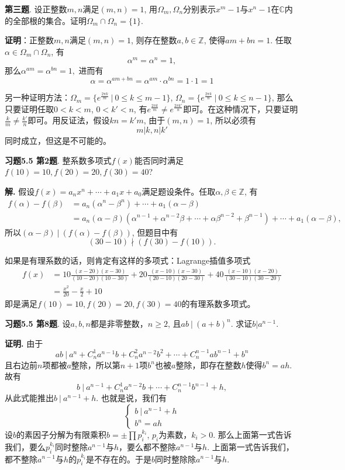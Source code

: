 \newpageorvspace


{\bf 第三题}. 设正整数$m,n$满足$(m,n)=1$, 用$\Omega_m, \Omega_n$分别表示$x^m-1$与$x^n-1$在$\mathbb{C}$内的全部根的集合。证明$\Omega_m \cap \Omega_n = \{1\}$.

{\bf 证明}：正整数$m,n$满足$(m,n)=1$, 则存在整数$a,b\in\mathbb{Z}$, 使得$am+bn=1$. 任取$\alpha\in \Omega_m \cap \Omega_n$, 有
$$\alpha^m = \alpha^n = 1,$$
那么$\alpha^{am} = \alpha^{bn} = 1,$ 进而有
$$\alpha = \alpha^{am+bn} = \alpha^{am} \cdot \alpha^{bn} = 1 \cdot 1 = 1$$

另一种证明方法：$\Omega_m = \{ e^{\frac{2\pi k}{m}} \ |\ 0\leqslant k \leqslant m-1 \}$, $\Omega_n = \{ e^{\frac{2\pi k}{n}} \ |\ 0\leqslant k \leqslant n-1 \}$, 那么只要证明任取$0 < k < m$, $0 < k' < n$, 有$e^{\frac{2\pi k}{m}} \neq e^{\frac{2\pi k'}{n}}$即可。在这种情况下，只要证明$\frac{k}{m} \neq \frac{k'}{n}$即可。用反证法，假设$kn=k'm$, 由于$(m,n)=1$, 所以必须有
$$m|k, n|k'$$
同时成立，但这是不可能的。


\newpageorvspace


{\bf 习题5.5 第2题}. 整系数多项式$f(x)$能否同时满足$f(10)=10, f(20)=20, f(30)=40$?

{\bf 解.} 假设$f(x) = a_nx^n + \cdots + a_1x + a_0$满足题设条件。任取$\alpha,\beta\in\mathbb{Z}$, 有
\begin{align*}
f(\alpha) - f(\beta) & = a_n(\alpha^n-\beta^n) + \cdots + a_1(\alpha-\beta) \\
& = a_n(\alpha-\beta)(\alpha^{n-1}+\alpha^{n-2}\beta+\cdots+\alpha\beta^{n-2}+\beta^{n-1}) + \cdots + a_1(\alpha-\beta),
\end{align*}
所以$(\alpha-\beta) \ |\ (f(\alpha) - f(\beta))$, 但题目中有
$$(30-10) \nmid (f(30)-f(10)).$$

如果是有理系数的话，则肯定有这样的多项式：Lagrange插值多项式
\begin{align*}
f(x) & = 10\frac{(x-20)(x-30)}{(10-20)(10-30)} + 20\frac{(x-10)(x-30)}{(20-10)(20-30)} + 40\frac{(x-10)(x-20)}{(30-10)(30-20)} \\
& = \frac{x^2}{20} - \frac{x}{2} + 10
\end{align*}
即是满足$f(10)=10, f(20)=20, f(30)=40$的有理系数多项式。


\newpageorvspace


{\bf 习题5.5 第8题}. 设$a,b,n$都是非零整数，$n\geqslant 2$, 且$ab\ |\ (a+b)^n$. 求证$b|a^{n-1}$.

{\bf 证明.} 由于
$$ab\ |\ a^n + C_n^1a^{n-1}b + C_n^2a^{n-2}b^2 + \cdots + C_n^{n-1}ab^{n-1} + b^n$$
且右边前$n$项都被$a$整除，所以第$n+1$项$b^n$也被$a$整除，即存在整数$h$使得$b^n = ah$. 故有
$$b\ |\ a^{n-1} + C_n^1a^{n-2}b + \cdots + C_n^{n-1}b^{n-1} + h,$$
从此式能推出$b\ |\ a^{n-1} + h$. 也就是说，我们有
$$
\begin{cases}
b\ |\ a^{n-1} + h \\
b^n = ah
\end{cases}
$$
设$b$的素因子分解为有限乘积$b = \pm \prod p_i^{k_i}$, $p_i$为素数，$k_i>0$. 那么上面第一式告诉我们，要么$p_i^{k_i}$同时整除$a^{n-1}$与$h$，要么都不整除$a^{n-1}$与$h$. 上面第一式告诉我们，都不整除$a^{n-1}$与$h$的$p_i^{k_i}$是不存在的。于是$b$同时整除除$a^{n-1}$与$h$.

